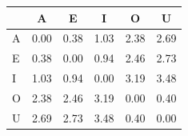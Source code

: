 \begin{tabular}{lccccc}
\toprule
\rowcolor{col01}
 & A & E & I & O & U \\
\midrule
A & 0.00 & 0.38 & 1.03 & 2.38 & 2.69 \\
E & 0.38 & 0.00 & 0.94 & 2.46 & 2.73 \\
I & 1.03 & 0.94 & 0.00 & 3.19 & 3.48 \\
O & 2.38 & 2.46 & 3.19 & 0.00 & 0.40 \\
U & 2.69 & 2.73 & 3.48 & 0.40 & 0.00 \\
\bottomrule
\end{tabular}
